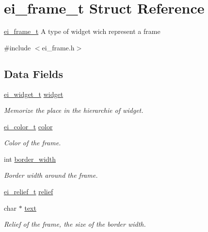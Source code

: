 \hypertarget{structei__frame__t}{\section{ei\+\_\+frame\+\_\+t Struct Reference}
\label{structei__frame__t}
}


\hyperlink{structei__frame__t}{ei\+\_\+frame\+\_\+t} A type of widget wich represent a frame  




{\ttfamily \#include $<$ei\+\_\+frame.\+h$>$}

\subsection*{Data Fields}
\begin{DoxyCompactItemize}
\item 
\hyperlink{structei__widget__t}{ei\+\_\+widget\+\_\+t} \hyperlink{structei__frame__t_a712db0711a6f2da5e96df73f562572b6}{widget}
\begin{DoxyCompactList}\small\item\em Memorize the place in the hierarchie of widget. \end{DoxyCompactList}\item 
\hyperlink{structei__color__t}{ei\+\_\+color\+\_\+t} \hyperlink{structei__frame__t_a421c7e34ec7903666726f2238d3225ea}{color}
\begin{DoxyCompactList}\small\item\em Color of the frame. \end{DoxyCompactList}\item 
int \hyperlink{structei__frame__t_a3f06d929024f5c8355099f1ea734ddd8}{border\+\_\+width}
\begin{DoxyCompactList}\small\item\em Border width around the frame. \end{DoxyCompactList}\item 
\hyperlink{ei__types_8h_aa79a32b1d8ece0e44cfa394e870b270b}{ei\+\_\+relief\+\_\+t} \hyperlink{structei__frame__t_a4d0e33d09e4119629f4fa13107b4a9f3}{relief}
\item 
char $\ast$ \hyperlink{structei__frame__t_a5fd5ab12410cb7eb268c13e042624349}{text}
\begin{DoxyCompactList}\small\item\em Relief of the frame, the size of the border width. \end{DoxyCompactList}\item 

\end{DoxyCompactItemize}
